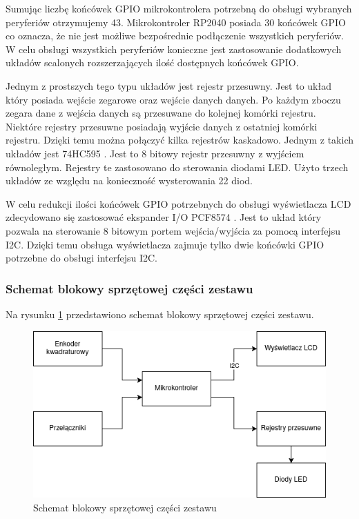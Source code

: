\documentclass[../main.tex]{subfiles}
\begin{document}
    Sumując liczbę końcówek GPIO mikrokontrolera potrzebną do obsługi wybranych peryferiów otrzymujemy 43. 
    Mikrokontroler RP2040 posiada 30 końcówek GPIO \cite{rp:rp2040} co oznacza, że nie jest możliwe bezpośrednie podłączenie wszystkich peryferiów.
    W celu obsługi wszystkich peryferiów konieczne jest zastosowanie dodatkowych układów scalonych rozszerzających ilość dostępnych końcówek GPIO.
    \par
    Jednym z prostszych tego typu układów jest rejestr przesuwny. Jest to układ który posiada wejście zegarowe oraz wejście danych
    danych. Po każdym zboczu zegara dane z wejścia danych są przesuwane do kolejnej komórki rejestru. Niektóre rejestry przesuwne 
    posiadają wyjście danych z ostatniej komórki rejestru. Dzięki temu można połączyć kilka rejestrów kaskadowo. Jednym z takich układów jest
    74HC595 \cite{ti:74hc595}. Jest to 8 bitowy rejestr przesuwny z wyjściem równoległym. Rejestry te zastosowano do sterowania diodami LED. Użyto trzech
    układów ze względu na konieczność wysterowania 22 diod.
    \par
    W celu redukcji ilości końcówek GPIO potrzebnych do obsługi wyświetlacza LCD zdecydowano się zastosować ekspander I/O PCF8574 \cite{ti:pcf8574}.
    Jest to układ który pozwala na sterowanie 8 bitowym portem wejścia/wyjścia za pomocą interfejsu I2C. Dzięki temu obsługa wyświetlacza 
    zajmuje tylko dwie końcówki GPIO potrzebne do obsługi interfejsu I2C. 

    \subsubsection{Schemat blokowy sprzętowej części zestawu}

    Na rysunku \ref{fig:hardware_diagram} przedstawiono schemat blokowy sprzętowej części zestawu.
    
    \begin{figure}[H]
        \centering
        \includegraphics[width=\linewidth]{hardware_diagram.png}
        \caption{Schemat blokowy sprzętowej części zestawu}
        \label{fig:hardware_diagram}
    \end{figure}
    
\end{document}
